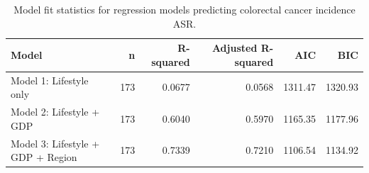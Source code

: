 \begin{table}
\centering
\caption{Model fit statistics for regression models predicting colorectal cancer incidence ASR.}
\label{tab:regression_model_fit}
\begin{tabular}{lrrrrr}
\toprule
                            Model &   n &  R-squared &  Adjusted R-squared &     AIC &     BIC \\
\midrule
          Model 1: Lifestyle only & 173 &     0.0677 &              0.0568 & 1311.47 & 1320.93 \\
         Model 2: Lifestyle + GDP & 173 &     0.6040 &              0.5970 & 1165.35 & 1177.96 \\
Model 3: Lifestyle + GDP + Region & 173 &     0.7339 &              0.7210 & 1106.54 & 1134.92 \\
\bottomrule
\end{tabular}
\end{table}
